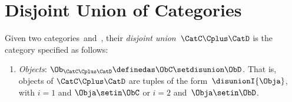 
\section{Disjoint Union of Categories}

\begin{ctdefinition}
    \label{def:disjoint-union-category}
    Given two categories~\CatC and~\CatD, their \emph{disjoint union}~$\CatC\Cplus\CatD$ is the category specified as follows:
    \begin{enumerate}
        \item \emph{Objects}: $\Ob_{\CatC\Cplus\CatD} \definedas \ObC \setdisunion \ObD$.
              That is, objects of $\CatC\Cplus\CatD$ are tuples of the form~$\disunionI{\Obja}$, with $i=1$ and $\Obja \setin \ObC$ or $i=2$ and~$\Obja \setin \ObD$.


\end{enumerate}
\end{ctdefinition}
